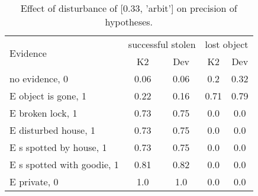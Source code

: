 \begin{table}\begin{tabular}{l|cc|cc}\toprule\multirow{2}{*}{Evidence} & \multicolumn{2}{c}{successful stolen}& \multicolumn{2}{c}{lost object}\\& {K2} & {Dev}& {K2} & {Dev}\\\midrule
no evidence, 0 & 0.06&0.06&\cellcolor{Bittersweet}0.2&\cellcolor{Bittersweet}0.32\\E object is gone, 1 & \cellcolor{Bittersweet}0.22&\cellcolor{Bittersweet}0.16&\cellcolor{Bittersweet}0.71&\cellcolor{Bittersweet}0.79\\E broken lock, 1 & 0.73&0.75&0.0&0.0\\E disturbed house, 1 & 0.73&0.75&0.0&0.0\\E s spotted by house, 1 & 0.73&0.75&0.0&0.0\\E s spotted with goodie, 1 & 0.81&0.82&0.0&0.0\\E private, 0 & 1.0&1.0&0.0&0.0\\\bottomrule\end{tabular}\caption{Effect of disturbance of [0.33, 'arbit'] on precision of hypotheses.}\end{table}